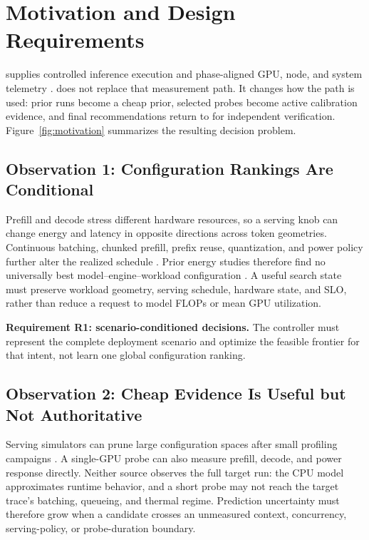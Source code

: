 \section{Motivation and Design Requirements}

\bench{} supplies controlled inference execution and phase-aligned GPU, node,
and system telemetry \cite{niu2026tokenpowerbench}.  \system{} does not replace that measurement
path.  It changes how the path is used: prior runs become a cheap prior,
selected probes become active calibration evidence, and final recommendations
return to \bench{} for independent verification.  Figure~\ref{fig:motivation}
summarizes the resulting decision problem.



\subsection{Observation 1: Configuration Rankings Are Conditional}

Prefill and decode stress different hardware resources, so a serving knob can
change energy and latency in opposite directions across token geometries.
Continuous batching, chunked prefill, prefix reuse, quantization,
and power policy further alter the realized schedule
\cite{kwon2023vllm,agrawal2024sarathi,zhong2024distserve,lee2026beam}.
Prior energy studies therefore find no universally best
model--engine--workload configuration
\cite{niu2025engines,fernandez2025energy}.  A useful search state must preserve
workload geometry, serving schedule, hardware state, and SLO, rather than reduce a
request to model FLOPs or mean GPU utilization.

\textbf{Requirement R1: scenario-conditioned decisions.}  The controller must
represent the complete deployment scenario and optimize the feasible frontier
for that intent, not learn one global configuration ranking.

\subsection{Observation 2: Cheap Evidence Is Useful but Not Authoritative}

Serving simulators can prune large configuration spaces after small profiling
campaigns \cite{agrawal2024vidur,yang2026charon}.  A single-GPU probe can also
measure prefill, decode, and power response directly.  Neither source observes
the full target run: the CPU model approximates runtime behavior, and a short
probe may not reach the target trace's batching, queueing, and thermal regime.
Prediction uncertainty must therefore grow when a candidate crosses an
unmeasured context, concurrency, serving-policy, or probe-duration boundary.

